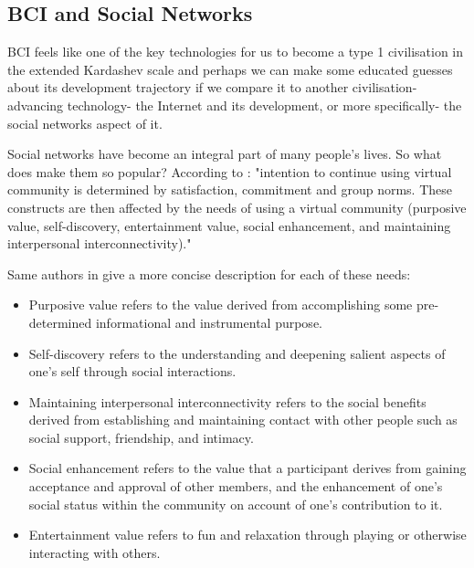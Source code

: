 \documentclass[fleqn,11pt]{olplainarticle}
\begin{document}
\subsection{BCI and Social Networks}
BCI feels like one of the key technologies for us to become a type 1 civilisation in the extended Kardashev scale \cite{gray2020extended} and perhaps we can make some educated guesses about its development trajectory if we compare it to another civilisation-advancing technology- the Internet and its development, or more specifically- the social networks aspect of it.

Social networks have become an integral part of many people's lives. So what does make them so popular? According to \cite{cheung2009understanding}: "intention to continue using virtual community is determined by satisfaction, commitment and group norms. These constructs are then affected by the needs of using a virtual community (purposive value, self-discovery, entertainment value, social enhancement, and maintaining interpersonal interconnectivity)."

Same authors in \cite{cheung2011online} give a more concise description for each of these needs: 
\begin{displayquote}
    \begin{itemize}
        \item Purposive value refers to the value derived from accomplishing some pre-determined informational and instrumental purpose.
        \item Self-discovery refers to the understanding and deepening salient aspects of one’s self through social interactions.
        \item Maintaining interpersonal interconnectivity refers to the social benefits derived from establishing and maintaining contact with other people such as social support, friendship, and intimacy.
        \item Social enhancement refers to the value that a participant derives from gaining acceptance and approval of other members, and the enhancement of one’s social status within the community on account of one’s contribution to it.
        \item Entertainment value refers to fun and relaxation through playing or otherwise interacting with others.
    \end{itemize}
\end{displayquote}
\end{document}

